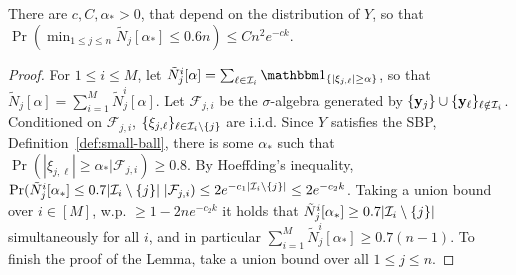 \documentclass[times,sort&compress,3p]{elsarticle}
\begin{document}
\begin{lemma}\label{lem:Tyl-inv-appendix-3}
    There are $c,C,\alpha_*>0$, that depend on the distribution of $Y$, so that ${\Pr(\min_{1\le j\le n} \tilde{N}_j[\alpha_*]\le 0.6n)\le Cn^2e^{-ck}}$.
    \begin{proof}
        For $1\le i \le M$, let $\tilde{N}_j^i[\alpha] = \sum_{\ell\in \Ic_i} \indic{|\xi_{j,\ell}|\ge \alpha}$, so that $\tilde{N}_j[\alpha]=\sum_{i=1}^M \tilde{N}_j^i[\alpha]$. 
        Let $\mathcal{F}_{j,i}$ be the $\sigma$-algebra generated by $\{{\bf y}_j\}\cup \{{\bf y}_\ell\}_{\ell\notin \mathcal{I}_i }$. Conditioned on $\mathcal{F}_{j,i}$, $\{\xi_{j,\ell}\}_{\ell\in\mathcal{I}_i\setminus\{j\}}$ are i.i.d. 
        Since $Y$ satisfies the SBP, Definition~\ref{def:small-ball}, there is some $\alpha_*$ such that $\Pr(|\xi_{j,\ell}|\ge \alpha_*|\mathcal{F}_{j,i})\ge 0.8$. By Hoeffding's inequality, $\Pr(\tilde{N}_j^i[\alpha_*]\le 0.7|\mathcal{I}_i\setminus\{j\}|\;|\mathcal{F}_{j,i}) \le 2e^{-c_1|\mathcal{I}_i\setminus\{j\}|} \le 2e^{-c_2k}$. Taking a union bound over $i\in [M]$, w.p. $\ge 1-2ne^{-c_2k}$ it holds that $\tilde{N}_j^i[\alpha_*]\ge 0.7|\mathcal{I}_i\setminus\{j\}|$ simultaneously for all $i$, and in particular $\sum_{i=1}^M \tilde{N}_j^i[\alpha_*] \ge 0.7(n-1)$. To finish the proof of the Lemma, take a union bound over all $1\le j \le n$.
    \end{proof}
\end{lemma}
\end{document}
